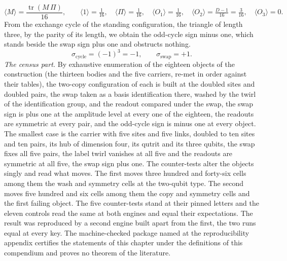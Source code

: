 \begin{chproof}
\begin{equation}
\langle M \rangle = \frac{\operatorname{tr}(M\,\Pi)}{16}, \qquad \langle 1 \rangle = \tfrac{1}{16}, \quad \langle \Pi \rangle = \tfrac{1}{16}, \quad \langle O_{1} \rangle = \tfrac{1}{16}, \quad \langle O_{2} \rangle = \tfrac{D - 1}{16} = \tfrac{3}{16}, \quad \langle O_{3} \rangle = 0 .
\end{equation}
From the exchange cycle of the standing configuration, the triangle of length three, by the parity of its length, we obtain the odd-cycle sign minus one, which stands beside the swap sign plus one and obstructs nothing.
\begin{equation}
\sigma_{\mathrm{cycle}} = (-1)^{3} = -1, \qquad \sigma_{\mathrm{swap}} = +1 .
\end{equation}
\textit{The census part.}
By exhaustive enumeration of the eighteen objects of the construction (the thirteen bodies and the five carriers, re-met in order against their tables), the two-copy configuration of each is built at the doubled sites and doubled pairs, the swap taken as a basis identification there, washed by the twirl of the identification group, and the readout compared under the swap, the swap sign is plus one at the amplitude level at every one of the eighteen, the readouts are symmetric at every pair, and the odd-cycle sign is minus one at every object. The smallest case is the carrier with five sites and five links, doubled to ten sites and ten pairs, its hub of dimension four, its qutrit and its three qubits, the swap fixes all five pairs, the label twirl vanishes at all five and the readouts are symmetric at all five, the swap sign plus one.
The counter-tests alter the objects singly and read what moves. The first moves three hundred and forty-six cells among them the wash and symmetry cells at the two-qubit type. The second moves five hundred and six cells among them the copy and symmetry cells and the first failing object. The five counter-tests stand at their pinned letters and the eleven controls read the same at both engines and equal their expectations. The result was reproduced by a second engine built apart from the first, the two runs equal at every key.
The machine-checked package named at the reproducibility appendix certifies the statements of this chapter under the definitions of this compendium and proves no theorem of the literature.
\end{chproof}
